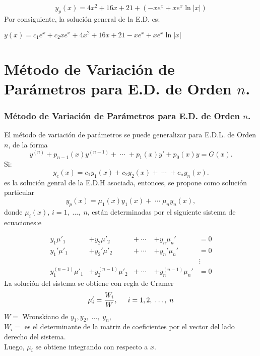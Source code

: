 \documentclass[9pt]{beamer}
\begin{document}
\begin{frame}[t]
	\begin{exampleblock}{}
		\[
				y_p(x) = 4x^2+16x+21+ (-xe^{x} +xe^x \ln |x|)
		\]
		Por consiguiente, la solución general de la E.D. es:
		\begin{center}
			\color{red} \underline{\color{black} \(y(x) = c_1e^x+c_2xe^x+4x^2+16x+21 -xe^x+xe^x \ln |x|\)}
		\end{center}
	\end{exampleblock}
\end{frame}

\section{Método de Variación de Parámetros para E.D. de Orden \(n\).} %
\begin{frame}[t]
	\begin{block}{}
		\frametitle{Método de Variación de Parámetros para E.D. de Orden \(n\).}
		El método de variación de parámetros se puede generalizar para E.D.L. de Orden \(n\), de la forma
		\[
			y^{(n)} + p_{n-1} (x) y^{(n-1)} + \;\cdots\; +p_1(x) y' + p_0(x) y = G(x).
		\]
		Si:
		\[
			y_c(x) = c_1y_1(x) + c_2y_2(x) + \;\cdots\; + c_ny_n(x).
		\]
		es la solución genral de la E.D.H asociada, entonces, se propone como solución particular
		\[
			y_p(x) = \mu _1(x) y_1(x) + \;\cdots\; \mu _ny_n(x),
		\]
		donde \(\mu _i(x)\), \(i=1, \;\ldots,\; n\), están determinadas por el siguiente sistema de ecuaciones:e
	\end{block}
\end{frame}

\begin{frame}[t]
	\begin{block}{}
		\vspace{-5mm}
			\begin{align*}
				y_1 \mu ' _1            &+          y_2 \mu ' _2            &+     \;\cdots\;    &+     y_n \mu _n'           &=    0 \\
				y_1' \mu ' _1           &+          y_2' \mu ' _2           &+     \;\cdots\;    &+     y_n' \mu _n'          &=    0 \\
				& & & &\vdots \\
				y_1^{(n-1)} \mu ' _1    &+          y_2^{(n-1)} \mu ' _2    &+     \;\cdots\;    &+     y_n^{(n-1)} \mu _n'   &=    0
			\end{align*}
			La solución del sistema se obtiene con regla de Cramer
			\[
				\mu _i' = \dfrac{W_i}{W}, \hspace{5mm} i=1,2, \;\ldots,\; n
			\]
			\(W =\) Wronskiano de \(y_1, y_2, \;\ldots,\; y_n\), \\[2mm]
			\(W_i=\) es el determinante de la matriz de coeficientes por el vector del lado derecho del sistema. \\[2mm]
			Luego, \(\mu _i\) se obtiene integrando con respecto a \(x\).
	\end{block}
\end{frame}
\end{document}
